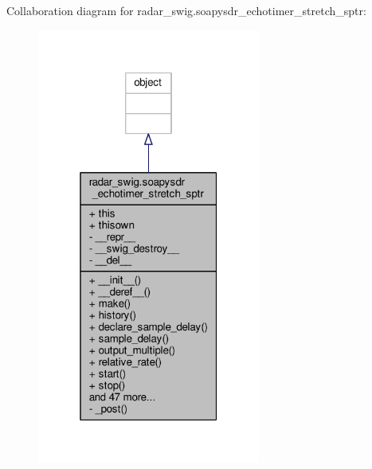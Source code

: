 Collaboration diagram for radar\+\_\+swig.\+soapysdr\+\_\+echotimer\+\_\+stretch\+\_\+sptr\+:
\nopagebreak
\begin{figure}[H]
\begin{center}
\leavevmode
\includegraphics[width=208pt]{d6/d0b/classradar__swig_1_1soapysdr__echotimer__stretch__sptr__coll__graph}
\end{center}
\end{figure}
